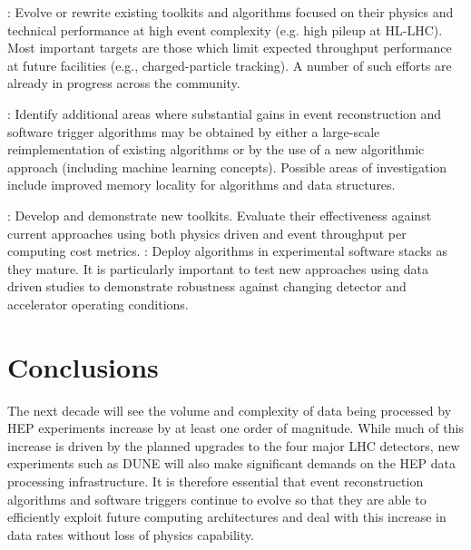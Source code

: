 \vskip 0.5cm
: Evolve or rewrite existing toolkits and algorithms focused on their physics and technical performance at high event complexity (e.g. high pileup at HL-LHC). Most important targets are those which limit expected throughput performance at future facilities (e.g., charged-particle tracking). A number of such efforts are already in progress across the community.

\vskip 0.5cm
: Identify additional areas where substantial gains in event reconstruction and software trigger algorithms may be obtained by either a large-scale reimplementation of existing algorithms or by the use of a new algorithmic approach (including machine learning concepts). Possible areas of investigation include improved memory locality for algorithms and data structures.

\vskip 0.5cm
: Develop and demonstrate new toolkits. Evaluate their effectiveness against current approaches using both physics driven and event throughput per computing cost metrics. 
\vskip 0.5cm
: Deploy algorithms in experimental software stacks as they mature. It is particularly important to test new approaches using data driven studies to demonstrate robustness against changing detector and accelerator operating conditions.

\section{Conclusions}

The next decade will see the volume and complexity of data being processed by HEP experiments increase by at least one order of magnitude. While much of this increase is driven by the planned upgrades to the four major LHC detectors, new experiments such as DUNE will also make significant demands on the HEP data processing infrastructure. It is therefore essential that event reconstruction algorithms and software triggers continue to evolve so that they are able to efficiently exploit future computing architectures and deal with this increase in data rates without loss of physics capability. 

